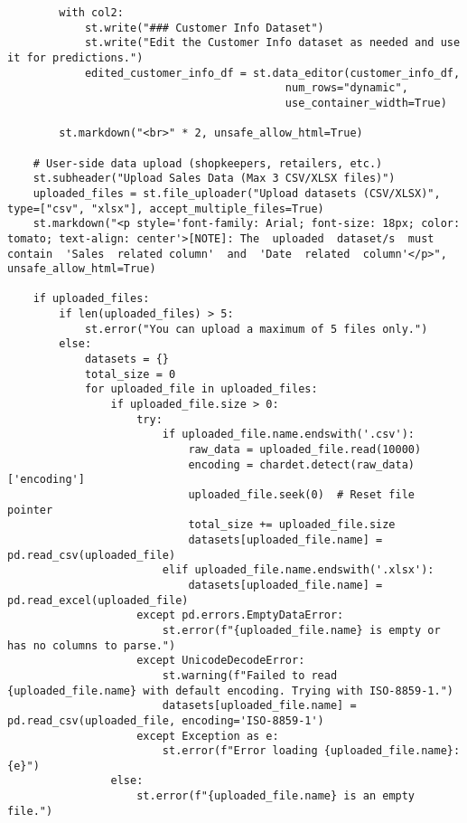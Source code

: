 \documentclass[10pt]{report}
\begin{document}
\begin{center}
\begin{lstlisting}
        with col2:
            st.write("### Customer Info Dataset")
            st.write("Edit the Customer Info dataset as needed and use it for predictions.")
            edited_customer_info_df = st.data_editor(customer_info_df, 
                                           num_rows="dynamic", 
                                           use_container_width=True)

        st.markdown("<br>" * 2, unsafe_allow_html=True)
    
    # User-side data upload (shopkeepers, retailers, etc.)
    st.subheader("Upload Sales Data (Max 3 CSV/XLSX files)")
    uploaded_files = st.file_uploader("Upload datasets (CSV/XLSX)", type=["csv", "xlsx"], accept_multiple_files=True)
    st.markdown("<p style='font-family: Arial; font-size: 18px; color: tomato; text-align: center'>[NOTE]: The  uploaded  dataset/s  must  contain  'Sales  related column'  and  'Date  related  column'</p>", unsafe_allow_html=True)
    
    if uploaded_files:
        if len(uploaded_files) > 5:
            st.error("You can upload a maximum of 5 files only.")
        else:
            datasets = {}
            total_size = 0
            for uploaded_file in uploaded_files:
                if uploaded_file.size > 0:
                    try:
                        if uploaded_file.name.endswith('.csv'):
                            raw_data = uploaded_file.read(10000)
                            encoding = chardet.detect(raw_data)['encoding']
                            uploaded_file.seek(0)  # Reset file pointer
                            total_size += uploaded_file.size
                            datasets[uploaded_file.name] = pd.read_csv(uploaded_file)
                        elif uploaded_file.name.endswith('.xlsx'):
                            datasets[uploaded_file.name] = pd.read_excel(uploaded_file)
                    except pd.errors.EmptyDataError:
                        st.error(f"{uploaded_file.name} is empty or has no columns to parse.")
                    except UnicodeDecodeError:
                        st.warning(f"Failed to read {uploaded_file.name} with default encoding. Trying with ISO-8859-1.")
                        datasets[uploaded_file.name] = pd.read_csv(uploaded_file, encoding='ISO-8859-1')
                    except Exception as e:
                        st.error(f"Error loading {uploaded_file.name}: {e}")
                else:
                    st.error(f"{uploaded_file.name} is an empty file.")                   


\end{lstlisting}
\end{center}
\end{document}
